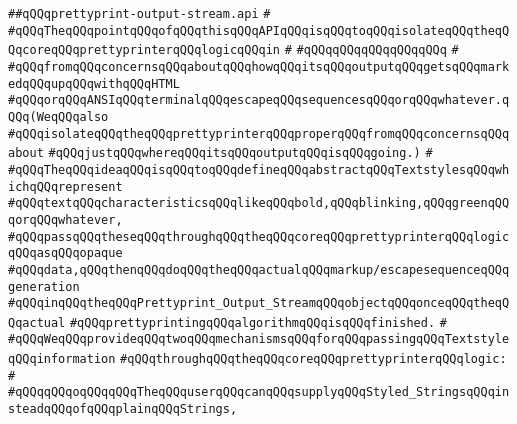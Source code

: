 \label{src/lib/prettyprint/big/src/out/prettyprint-output-stream.api}
\verb|##qQQqprettyprint-output-stream.api|\newline
\verb|#|\newline
\verb|#qQQqTheqQQqpointqQQqofqQQqthisqQQqAPIqQQqisqQQqtoqQQqisolateqQQqtheqQQqcoreqQQqprettyprinterqQQqlogicqQQqin|\newline
\verb|#|\newline
\verb|#qQQqqQQqqQQqqQQqqQQq|\newline
\verb|#|\newline
\verb|#qQQqfromqQQqconcernsqQQqaboutqQQqhowqQQqitsqQQqoutputqQQqgetsqQQqmarkedqQQqupqQQqwithqQQqHTML|\newline
\verb|#qQQqorqQQqANSIqQQqterminalqQQqescapeqQQqsequencesqQQqorqQQqwhatever.qQQq(WeqQQqalso|\newline
\verb|#qQQqisolateqQQqtheqQQqprettyprinterqQQqproperqQQqfromqQQqconcernsqQQqabout|\newline
\verb|#qQQqjustqQQqwhereqQQqitsqQQqoutputqQQqisqQQqgoing.)|\newline
\verb|#|\newline
\verb|#qQQqTheqQQqideaqQQqisqQQqtoqQQqdefineqQQqabstractqQQqTextstylesqQQqwhichqQQqrepresent|\newline
\verb|#qQQqtextqQQqcharacteristicsqQQqlikeqQQqbold,qQQqblinking,qQQqgreenqQQqorqQQqwhatever,|\newline
\verb|#qQQqpassqQQqtheseqQQqthroughqQQqtheqQQqcoreqQQqprettyprinterqQQqlogicqQQqasqQQqopaque|\newline
\verb|#qQQqdata,qQQqthenqQQqdoqQQqtheqQQqactualqQQqmarkup/escapesequenceqQQqgeneration|\newline
\verb|#qQQqinqQQqtheqQQqPrettyprint_Output_StreamqQQqobjectqQQqonceqQQqtheqQQqactual|\newline
\verb|#qQQqprettyprintingqQQqalgorithmqQQqisqQQqfinished.|\newline
\verb|#|\newline
\verb|#qQQqWeqQQqprovideqQQqtwoqQQqmechanismsqQQqforqQQqpassingqQQqTextstyleqQQqinformation|\newline
\verb|#qQQqthroughqQQqtheqQQqcoreqQQqprettyprinterqQQqlogic:|\newline
\verb|#|\newline
\verb|#qQQqqQQqoqQQqqQQqTheqQQquserqQQqcanqQQqsupplyqQQqStyled_StringsqQQqinsteadqQQqofqQQqplainqQQqStrings,|\newline
